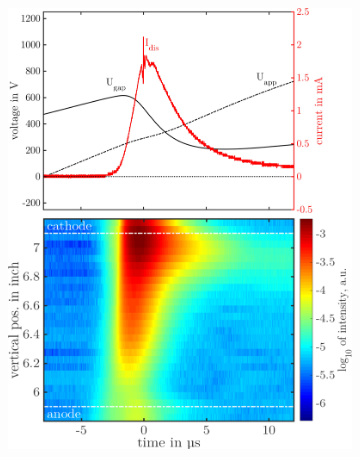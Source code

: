 \documentclass[a4paper,10pt,twoside]{article}
\begin{document}
		\onecolumn
				
				\begin{figure}
					\centering
					\begin{subfigure}[t]{0.49\textwidth}
						\includegraphics[width=\textwidth]{figures/706nm@sine/combination.pdf}
						\caption{}
						\label{img:combsine}
					\end{subfigure}
					\hfill
					\begin{subfigure}[t]{0.49\textwidth}

\end{subfigure}
\end{figure}
\end{document}
